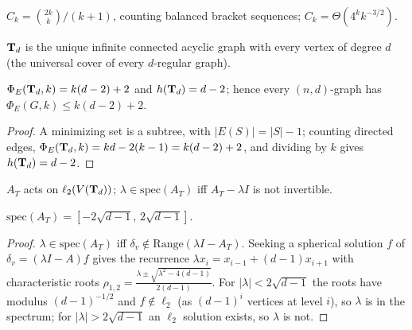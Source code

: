 \begin{definition}
  \label{def:catalan}
  \mathlibok
  $C_k=\binom{2k}k/(k+1)$, counting balanced bracket sequences; $C_k=\Theta(4^k
  k^{-3/2})$.
\end{definition}

\begin{definition}
  \label{def:d-regular-tree}
  $\Td$ is the unique infinite connected acyclic graph with every vertex of
  degree $d$ (the universal cover of every $d$-regular graph).
\end{definition}

\begin{theorem}[5.1.1, Expansion of $\Td$]
  \label{thm:tree-edge-expansion}
  $\Phi_E(\mathbf{T}_d,k)=k(d-2)+2$ and $h(\mathbf{T}_d)=d-2$; hence every $(n,d)$-graph has
  $\Phi_E(G,k)\le k(d-2)+2$.
\end{theorem}
\begin{proof}
  A minimizing set is a subtree, with $|E(S)|=|S|-1$; counting directed edges,
  $\Phi_E(\mathbf{T}_d,k)=kd-2(k-1)=k(d-2)+2$, and dividing by $k$ gives $h(\mathbf{T}_d)=d-2$.
\end{proof}

\begin{definition}
  \label{def:tree-spectrum-op}
  $A_T$ acts on $\ell_2(V(\mathbf{T}_d))$; $\lambda\in\mathrm{spec}(A_T)$ iff
  $A_T-\lambda I$ is not invertible.
\end{definition}

\begin{theorem}
  \label{thm:tree-spectrum}
  $\mathrm{spec}(A_T)=[-2\sqrt{d-1},\,2\sqrt{d-1}]$.
\end{theorem}
\begin{proof}
  $\lambda\in\mathrm{spec}(A_T)$ iff $\delta_v\notin\mathrm{Range}(\lambda
  I-A_T)$. Seeking a spherical solution $f$ of $\delta_v=(\lambda I-A)f$ gives the
  recurrence $\lambda x_i=x_{i-1}+(d-1)x_{i+1}$ with characteristic roots
  $\rho_{1,2}=\frac{\lambda\pm\sqrt{\lambda^2-4(d-1)}}{2(d-1)}$. For
  $|\lambda|<2\sqrt{d-1}$ the roots have modulus $(d-1)^{-1/2}$ and $f\notin
  \ell_2$ (as $(d-1)^i$ vertices at level $i$), so $\lambda$ is in the spectrum;
  for $|\lambda|>2\sqrt{d-1}$ an $\ell_2$ solution exists, so $\lambda$ is not.
\end{proof}


